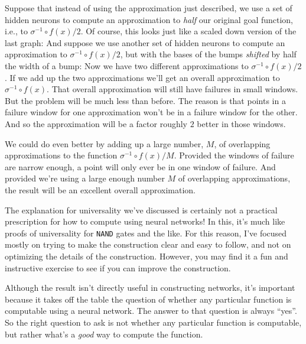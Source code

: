 Suppose that instead of using the approximation just described, we use a set of hidden neurons to compute an approximation to \emph{half} our original goal function, i.e., to $\sigma^{-1} \circ f(x) / 2$. Of course, this looks just like a scaled down version of the last graph: And suppose we use another set of hidden neurons to compute an approximation to $\sigma^{-1} \circ f(x)/ 2$, but with the bases of the bumps \emph{shifted} by half the width of a bump: Now we have two different approximations to $\sigma^{-1} \circ f(x) / 2$. If we add up the two approximations we'll get an overall approximation to $\sigma^{-1} \circ f(x)$. That overall approximation will still have failures in small windows. But the problem will be much less than before. The reason is that points in a failure window for one approximation won't be in a failure window for the other. And so the approximation will be a factor roughly $2$ better in those windows.


We could do even better by adding up a large number, $M$, of overlapping approximations to the function $\sigma^{-1} \circ f(x) / M$. Provided the windows of failure are narrow enough, a point will only ever be in one window of failure. And provided we're using a large enough number $M$ of overlapping approximations, the result will be an excellent overall approximation.





The explanation for universality we've discussed is certainly not a practical prescription for how to compute using neural networks! In this, it's much like proofs of universality for \texttt{NAND} gates and the like. For this reason, I've focused mostly on trying to make the construction clear and easy to follow, and not on optimizing the details of the construction. However, you may find it a fun and instructive exercise to see if you can improve the construction.


Although the result isn't directly useful in constructing networks, it's important because it takes off the table the question of whether any particular function is computable using a neural network. The answer to that question is always ``yes''. So the right question to ask is not whether any particular function is computable, but rather what's a \emph{good} way to compute the function.


